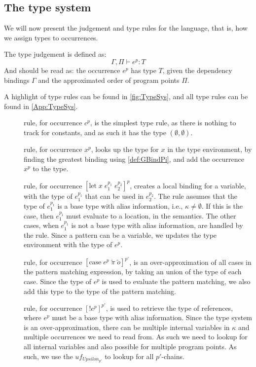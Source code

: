 \documentclass[acmsmall,sigplan]{acmart}
\begin{document}
\subsection{The type system}\label{sec:Judge}
We will now present the judgement and type rules for the language, that is, how we assign types to occurrences.

The type judgement is defined as:
$$\Gamma,\Pi\vdash e^p: T$$
And should be read as: the occurrence $e^p$ has type $T$, given the dependency bindings $\Gamma$ and the approximated order of program points $\Pi$.

A highlight of type rules can be found in \cref{fig:TypeSys}, and all type rules can be found in \cref{App:TypeSys}.

\begin{description}
	\item[] rule, for occurrence $c^p$, is the simplest type rule, as there is nothing to track for constants, and as such it has the type $(\emptyset,\emptyset)$.

	\item[] rule, for occurrence $x^p$, looks up the type for $x$ in the type environment, by finding the greatest binding using \cref{def:GBindPi}, and add the occurrence $x^p$ to the type.

	\item[] rule, for occurrence $[\mbox{let}\;x\;e_1^{p_1}\;e_2^{p_2}]^p$, creates a local binding for a variable, with the type of $e_1^{p_1}$ that can be used in $e_2^{p_2}$.
		The  rule assumes that the type of $e_1^{p_1}$ is a base type with alias information, i.e., $\kappa\neq\emptyset$.
		If this is the case, then $e_1^{p_1}$ must evaluate to a location, in the semantics.
		The other cases, when $e_1^{p_1}$ is not a base type with alias information, are handled by the  rule.
		Since a pattern can be a variable, we updates the type environment with the type of $e^p$.

	\item[] rule, for occurrence $[\mbox{case}\;e^{p}\;\tilde{\pi}\;\tilde{o}]^{p'}$, is an over-approximation of all cases in the pattern matching expression, by taking an union of the type of each case.
		Since the type of $e^p$ is used to evaluate the pattern matching, we also add this type to the type of the pattern matching.

	\item[] rule, for occurrence $[!e^{p}]^{p'}$, is used to retrieve the type of references, where $e^p$ must be a base type with alias information.
		Since the type system is an over-approximation, there can be multiple internal variables in $\kappa$ and multiple occurrences we need to read from.
		As such we need to lookup for all internal variables and also possible for multiple program points.
		As such, we use the $uf_{Upsilon_{p'}}$ to lookup for all $p'$-chains.
\end{description}
\end{document}
